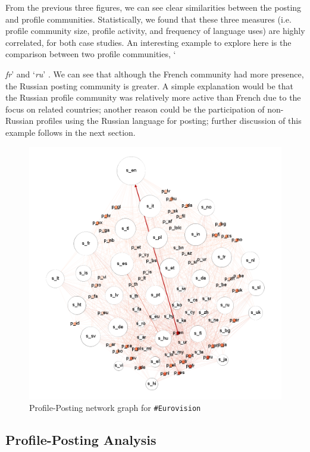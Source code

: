 From the previous three figures, we can see clear similarities between
the posting and profile communities. Statistically, we found that
these three measures (i.e. profile community size, profile activity,
and frequency of language uses) are highly correlated, for both case
studies. An interesting example to explore here is the comparison
between two profile communities, `{\emph{fr}' and `{\emph{ru}}' .  We
can see that although the French community had more presence, the
Russian posting community is greater. A simple explanation would be
that the Russian profile community was relatively more active than
French due to the focus on related countries; another reason could be
the participation of non-Russian profiles using the Russian language
for posting; further discussion of this example follows in the next
section.

\begin{figure}[htb]
\centering
\includegraphics[width=\columnwidth]{images/euro_pslang.png}
\caption{Profile-Posting network graph for {\texttt{\#Eurovision}}}
\label{fig:eurovisionpslang}
\end{figure}

\subsection{Profile-Posting Analysis}\label{eurovisionppanalysis}

}
